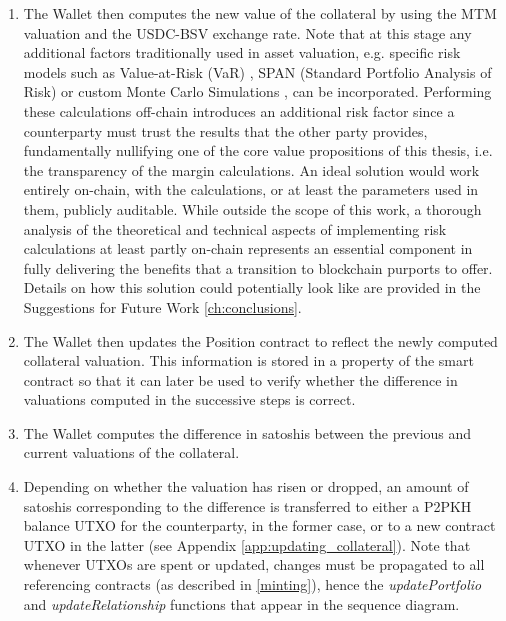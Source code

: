 \begin{enumerate}
\begin{enumerate}
        \item \label{item:risk_calc}The Wallet then computes the new value of the collateral by using the MTM valuation and the USDC-BSV exchange rate. Note that at this stage any additional factors traditionally used in asset valuation, e.g. specific risk models such as Value-at-Risk (VaR) \citep{VaR}, SPAN (Standard Portfolio Analysis of Risk) \citep{SPAN} or custom Monte Carlo Simulations \citep{monte_carlo}, can be incorporated. Performing these calculations off-chain introduces an additional risk factor since a counterparty must trust the results that the other party provides, fundamentally nullifying one of the core value propositions of this thesis, i.e. the transparency of the margin calculations. An ideal solution would work entirely on-chain, with the calculations, or at least the parameters used in them, publicly auditable. While outside the scope of this work, a thorough analysis of the theoretical and technical aspects of implementing risk calculations at least partly on-chain represents an essential component in fully delivering the benefits that a transition to blockchain purports to offer. Details on how this solution could potentially look like are provided in the Suggestions for Future Work \ref{ch:conclusions}.

        \item The Wallet then updates the Position contract to reflect the newly computed collateral valuation. This information is stored in a property of the smart contract so that it can later be used to verify whether the difference in valuations computed in the successive steps is correct.

        \item The Wallet computes the difference in satoshis between the previous and current valuations of the collateral.

        \item Depending on whether the valuation has risen or dropped, an amount of satoshis corresponding to the difference is transferred to either a P2PKH balance UTXO for the counterparty, in the former case, or to a new contract UTXO in the latter (see Appendix \ref{app:updating_collateral}). Note that whenever UTXOs are spent or updated, changes must be propagated to all referencing contracts (as described in \ref{minting}), hence the \textit{updatePortfolio} and \textit{updateRelationship} functions that appear in the sequence diagram.
        
    \end{enumerate}
    
\end{enumerate}
\thispagestyle{empty}

